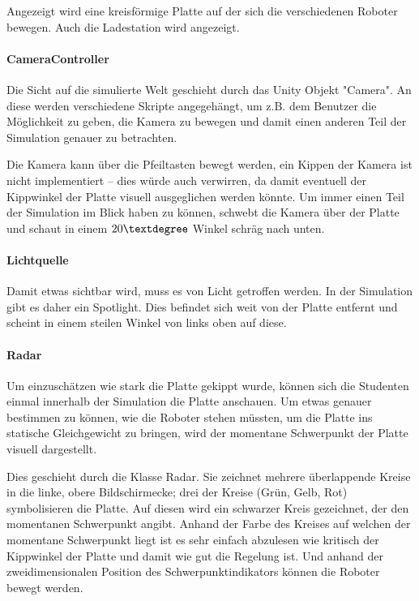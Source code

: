 Angezeigt wird eine kreisf{\"{o}}rmige Platte auf der sich die verschiedenen Roboter bewegen. Auch die
Ladestation wird angezeigt.

\paragraph{CameraController} Die Sicht auf die simulierte Welt geschieht durch das Unity Objekt "Camera". An diese
werden verschiedene Skripte angegeh{\"{a}}ngt, um z.B. dem Benutzer die M{\"{o}}glichkeit zu
geben, die Kamera zu bewegen und damit einen anderen Teil der Simulation genauer zu betrachten.

Die Kamera kann {\"{u}}ber die Pfeiltasten bewegt werden, ein Kippen der Kamera ist nicht implementiert --
dies w{\"{u}}rde auch verwirren, da damit eventuell der Kippwinkel der Platte visuell ausgeglichen
werden k{\"{o}}nnte. Um immer einen Teil der Simulation im Blick haben zu k{\"{o}}nnen, schwebt die Kamera
{\"{u}}ber der Platte und schaut in einem $20\textdegree$ Winkel schr{\"{a}}g nach unten.

\paragraph{Lichtquelle} Damit etwas sichtbar wird, muss es von Licht getroffen werden. In der Simulation
gibt es daher ein Spotlight. Dies befindet sich weit von der Platte entfernt und scheint in einem steilen Winkel
von links oben auf diese.

\paragraph{Radar} Um einzusch{\"{a}}tzen wie stark die Platte gekippt wurde, k{\"{o}}nnen sich die Studenten einmal
innerhalb der Simulation die Platte anschauen. Um etwas genauer bestimmen zu k{\"{o}}nnen, wie die Roboter stehen
m{\"{u}}ssten, um die Platte ins statische Gleichgewicht zu bringen, wird der momentane Schwerpunkt der Platte visuell
dargestellt.

Dies geschieht durch die Klasse Radar. Sie zeichnet mehrere {\"{u}}berlappende Kreise in die linke, obere Bildschirmecke;
drei der Kreise (Gr{\"{u}}n, Gelb, Rot) symbolisieren die Platte. Auf diesen wird ein schwarzer Kreis gezeichnet, der den
momentanen Schwerpunkt angibt. Anhand der Farbe des Kreises auf welchen der momentane Schwerpunkt liegt ist es sehr einfach
abzulesen wie kritisch der Kippwinkel der Platte und damit wie gut die Regelung ist. Und anhand der zweidimensionalen Position
des Schwerpunktindikators k{\"{o}}nnen die Roboter bewegt werden.

